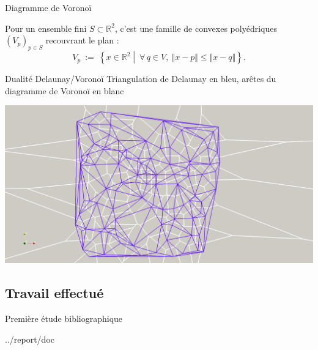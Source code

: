 \documentclass[aspectratio=169, 12pt, a4paper, hyperref={pdfauthor={Alexandre MARIN}, pdfkeywords={IFPEN, Delaunay, Voronoi, mesh generation}, colorlinks=true, linkcolor=purple, urlcolor=blue, citecolor=magenta}]{beamer}
\begin{document}
\begin{Energie}{Diagramme de Voronoï}

Pour un ensemble fini $S\subset\mathbb{R}^2$, c'est une famille de convexes polyédriques $(V_{p})_{p\in S}$ recouvrant le plan :
\[V_p\ :=\ \left\{x\in\mathbb{R}^2\middle\vert\ \forall\,q\in V,\ \Vert x-p\Vert\leqslant\Vert x-q\Vert\right\}\text{.}\]
\end{Energie}

\begin{Energie}{Dualité Delaunay/Voronoï}
\vspace*{-1cm}Triangulation de Delaunay en bleu,
arêtes du diagramme de Voronoï en blanc\\[0.8cm]
\begin{center}
\includegraphics[scale=0.18, viewport=450 30 1630 1300, clip]{duality.jpg}
\end{center}
\end{Energie}

\subsection{Travail effectué}
\begin{Energie}{Première étude bibliographique}

\begin{btSect}{../report/doc}
\btPrintCited
\btPrintNotCited
\end{btSect}
\label{biblio}
\end{Energie}
\end{document}
